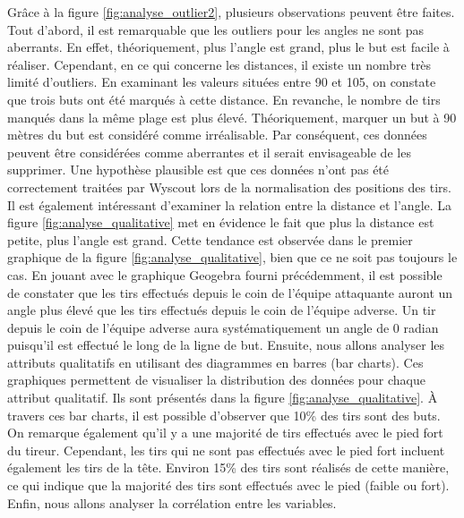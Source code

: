 \documentclass[12pt]{article}
\begin{document}
Grâce à la figure \ref{fig:analyse_outlier2}, plusieurs observations peuvent être faites. 
Tout d'abord, il est remarquable que les outliers pour les angles ne sont pas aberrants. 
En effet, théoriquement, plus l'angle est grand, plus le but est facile à réaliser. 
Cependant, en ce qui concerne les distances, il existe un nombre très limité d'outliers. 
En examinant les valeurs situées entre 90 et 105, on constate que trois buts ont été marqués à cette distance. 
En revanche, le nombre de tirs manqués dans la même plage est plus élevé.
Théoriquement, marquer un but à 90 mètres du but est considéré comme irréalisable. 
Par conséquent, ces données peuvent être considérées comme aberrantes et il serait envisageable de les supprimer. 
Une hypothèse plausible est que ces données n'ont pas été correctement traitées par Wyscout lors de la normalisation des positions des tirs.
\newline\newline
Il est également intéressant d'examiner la relation entre la distance et l'angle. 
La figure \ref{fig:analyse_qualitative} met en évidence le fait que plus la distance est petite, plus l'angle est grand. 
Cette tendance est observée dans le premier graphique de la figure \ref{fig:analyse_qualitative}, bien que ce ne soit pas toujours le cas. 
En jouant avec le graphique Geogebra fourni précédemment, il est possible de constater que les tirs effectués depuis le coin de l'équipe attaquante auront un angle plus élevé que les tirs effectués depuis le coin de l'équipe adverse.
Un tir depuis le coin de l'équipe adverse aura systématiquement un angle de 0 radian puisqu'il est effectué le long de la ligne de but.
\newline\newline
Ensuite, nous allons analyser les attributs qualitatifs en utilisant des diagrammes en barres (bar charts). 
Ces graphiques permettent de visualiser la distribution des données pour chaque attribut qualitatif. 
Ils sont présentés dans la figure \ref{fig:analyse_qualitative}. 
À travers ces bar charts, il est possible d'observer que 10\% des tirs sont des buts. 
On remarque également qu'il y a une majorité de tirs effectués avec le pied fort du tireur. 
Cependant, les tirs qui ne sont pas effectués avec le pied fort incluent également les tirs de la tête.
Environ 15\% des tirs sont réalisés de cette manière, ce qui indique que la majorité des tirs sont effectués avec le pied (faible ou fort).
\newline\newline
Enfin, nous allons analyser la corrélation entre les variables.
\end{document}
